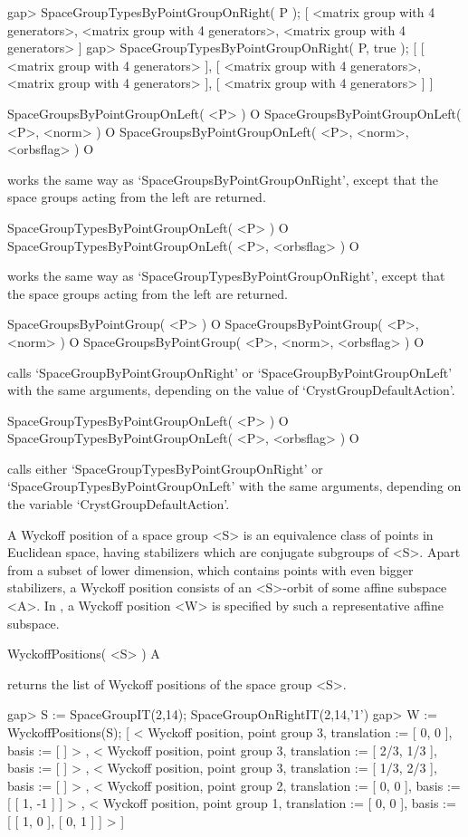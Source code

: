 \beginexample
gap> SpaceGroupTypesByPointGroupOnRight( P );
[ <matrix group with 4 generators>, <matrix group with 4 generators>, 
  <matrix group with 4 generators> ]
gap> SpaceGroupTypesByPointGroupOnRight( P, true );
[ [ <matrix group with 4 generators> ], 
  [ <matrix group with 4 generators>, <matrix group with 4 generators> ], 
  [ <matrix group with 4 generators> ] ]
\endexample

\>SpaceGroupsByPointGroupOnLeft( <P> ) O
\>SpaceGroupsByPointGroupOnLeft( <P>, <norm> ) O
\>SpaceGroupsByPointGroupOnLeft( <P>, <norm>, <orbsflag> ) O

works the same way as `SpaceGroupsByPointGroupOnRight', except that
the space groups acting from the left are returned.

\>SpaceGroupTypesByPointGroupOnLeft( <P> ) O
\>SpaceGroupTypesByPointGroupOnLeft( <P>, <orbsflag> ) O

works the same way as `SpaceGroupTypesByPointGroupOnRight', except that
the space groups acting from the left are returned.

\>SpaceGroupsByPointGroup( <P> ) O
\>SpaceGroupsByPointGroup( <P>, <norm> ) O
\>SpaceGroupsByPointGroup( <P>, <norm>, <orbsflag> ) O

calls `SpaceGroupByPointGroupOnRight' or `SpaceGroupByPointGroupOnLeft' 
with the same arguments, depending on the value of `CrystGroupDefaultAction'.

\>SpaceGroupTypesByPointGroupOnLeft( <P> ) O
\>SpaceGroupTypesByPointGroupOnLeft( <P>, <orbsflag> ) O

calls either `SpaceGroupTypesByPointGroupOnRight' or
`SpaceGroupTypesByPointGroupOnLeft' with the same arguments, depending
on the variable `CrystGroupDefaultAction'.


A Wyckoff position of a space group <S> is an equivalence class of
points in Euclidean space, having stabilizers which are conjugate
subgroups of <S>.  Apart from a subset of lower dimension, which
contains points with even bigger stabilizers, a Wyckoff position
consists of an <S>-orbit of some affine subspace <A>. In {\Cryst},
a Wyckoff position <W> is specified by such a representative affine
subspace.

\>WyckoffPositions( <S> ) A

returns the list of Wyckoff positions of the space group <S>.

\beginexample
gap> S := SpaceGroupIT(2,14);
SpaceGroupOnRightIT(2,14,'1')
gap> W := WyckoffPositions(S);
[ < Wyckoff position, point group 3, translation := [ 0, 0 ], 
    basis := [  ] >
    , < Wyckoff position, point group 3, translation := [ 2/3, 1/3 ], 
    basis := [  ] >
    , < Wyckoff position, point group 3, translation := [ 1/3, 2/3 ], 
    basis := [  ] >
    , < Wyckoff position, point group 2, translation := [ 0, 0 ], 
    basis := [ [ 1, -1 ] ] >
    , < Wyckoff position, point group 1, translation := [ 0, 0 ], 
    basis := [ [ 1, 0 ], [ 0, 1 ] ] >
     ]
\endexample

